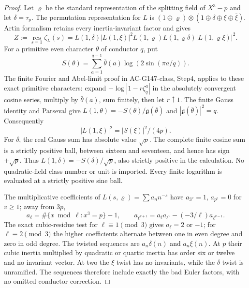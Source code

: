 \begin{proof}
Let $\varrho$ be the standard representation of the splitting
field of $X^3-p$ and let $\delta=\tau_p$.
The permutation representation for $L$ is
$(1\oplus\varrho)\otimes(1\oplus\delta\oplus\xi\oplus\bar\xi)$.
Artin formalism retains every inertia-invariant factor and gives
\[
 Z:=\operatorname*{res}_{s=1}\zeta_L(s)
 =L(1,\delta)|L(1,\xi)|^2
      L(1,\varrho)L(1,\varrho\delta)|L(1,\varrho\xi)|^2.
 \tag{G152C.16}
\]
For a primitive even character $\theta$ of conductor $q$, put
\[
 S(\theta)=\sum_{a=1}^{q-1}\bar\theta(a)
                                 \log(2\sin(\pi a/q)).
 \tag{G152C.17}
\]
The finite Fourier and Abel-limit proof in AC-G147-class,
Step4, applies to these exact primitive characters: expand
$-\log|1-r\zeta_q^a|$ in the absolutely convergent cosine
series, multiply by $\bar\theta(a)$, sum finitely, then let
$r\uparrow1$.  The finite Gauss identity and Parseval give
$L(1,\theta)=-S(\theta)/\mathfrak g(\bar\theta)$ and
$|\mathfrak g(\bar\theta)|^2=q$.
Consequently
\[
                 |L(1,\xi)|^2=|S(\xi)|^2/(4p).
 \tag{G152C.18}
\]
For $\delta$, the real Gauss sum has absolute value $\sqrt p$.
The complete finite cosine sum is a strictly positive ball,
between sixteen and seventeen, and hence has sign $+\sqrt p$.
Thus $L(1,\delta)=-S(\delta)/\sqrt p$, also strictly positive
in the calculation.
No quadratic-field class number or unit is imported.
Every finite logarithm is evaluated at a strictly positive sine ball.

The multiplicative coefficients of $L(s,\varrho)=\sum a_n n^{-s}$
have $a_{3^v}=1$, $a_{p^v}=0$ for $v\ge1$; away from $3p$,
\[
 a_\ell=\#\{x\bmod\ell:x^3=p\}-1,\qquad
 a_{\ell^{v+1}}=a_\ell a_{\ell^v}-(-3/\ell)a_{\ell^{v-1}}.
 \tag{G152C.19}
\]
The exact cubic-residue test for $\ell\equiv1\pmod3$ gives
$a_\ell=2$ or $-1$; for $\ell\equiv2\pmod3$ the higher
coefficients alternate between one in even degree and zero in odd degree.
The twisted sequences are $a_n\delta(n)$ and $a_n\xi(n)$.
At $p$ their cubic inertia multiplied by quadratic or quartic
inertia has order six or twelve and no invariant vector.
At two the $\xi$ twist has no invariants, while the $\delta$
twist is unramified.  The sequences therefore include exactly
the bad Euler factors, with no omitted conductor correction.


\end{proof}

